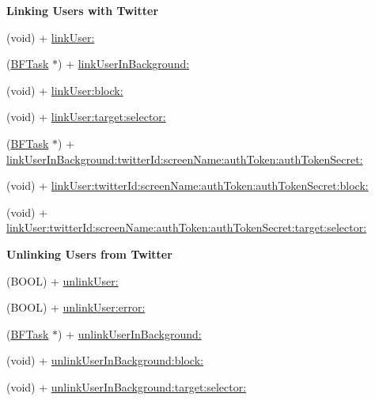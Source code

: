 \begin{Indent}{\bf Linking Users with Twitter}\par
{\em 

 

 }\begin{DoxyCompactItemize}
\item 
(void) + \hyperlink{interface_p_f_twitter_utils_a0188a34093710d9f17ad4a667c3cabb9}{link\+User\+:}
\item 
(\hyperlink{interface_b_f_task}{B\+F\+Task} $\ast$) + \hyperlink{interface_p_f_twitter_utils_aa6ff7d471cb0cf129772beac65899c9f}{link\+User\+In\+Background\+:}
\item 
(void) + \hyperlink{interface_p_f_twitter_utils_a73f2efd2e025523232e107c7fc666727}{link\+User\+:block\+:}
\item 
(void) + \hyperlink{interface_p_f_twitter_utils_a189f6500aaa2ab65eaf5fca61774ae77}{link\+User\+:target\+:selector\+:}
\item 
(\hyperlink{interface_b_f_task}{B\+F\+Task} $\ast$) + \hyperlink{interface_p_f_twitter_utils_a0058d585605c20245135e8ca9673111f}{link\+User\+In\+Background\+:twitter\+Id\+:screen\+Name\+:auth\+Token\+:auth\+Token\+Secret\+:}
\item 
(void) + \hyperlink{interface_p_f_twitter_utils_abb68e7eb47fe8a5cb42033f18b83ba4a}{link\+User\+:twitter\+Id\+:screen\+Name\+:auth\+Token\+:auth\+Token\+Secret\+:block\+:}
\item 
(void) + \hyperlink{interface_p_f_twitter_utils_ae8b78960271f16d55d0c1d189b3b1fdf}{link\+User\+:twitter\+Id\+:screen\+Name\+:auth\+Token\+:auth\+Token\+Secret\+:target\+:selector\+:}
\end{DoxyCompactItemize}
\end{Indent}
\begin{Indent}{\bf Unlinking Users from Twitter}\par
{\em 

 

 }\begin{DoxyCompactItemize}
\item 
(B\+O\+O\+L) + \hyperlink{interface_p_f_twitter_utils_aab9a874baf4f514dbfafc3c5d3b28bc2}{unlink\+User\+:}
\item 
(B\+O\+O\+L) + \hyperlink{interface_p_f_twitter_utils_a6a5a9cb44784f240e405e49be8958200}{unlink\+User\+:error\+:}
\item 
(\hyperlink{interface_b_f_task}{B\+F\+Task} $\ast$) + \hyperlink{interface_p_f_twitter_utils_a4aea7b874c415647bdf4240e9bccc41d}{unlink\+User\+In\+Background\+:}
\item 
(void) + \hyperlink{interface_p_f_twitter_utils_a5596c4e7857cd20855c2bc800c806611}{unlink\+User\+In\+Background\+:block\+:}
\item 
(void) + \hyperlink{interface_p_f_twitter_utils_a1d2809a2982e3fd53b44ed78e202c4b7}{unlink\+User\+In\+Background\+:target\+:selector\+:}
\end{DoxyCompactItemize}
\end{Indent}


